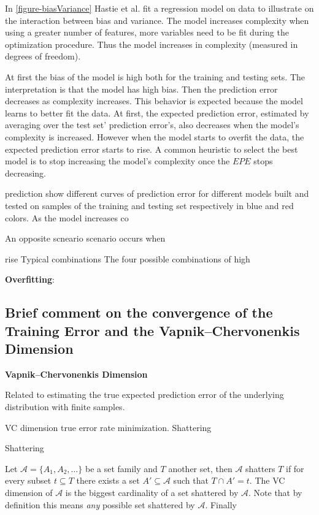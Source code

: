 In \ref{figure-biasVariance} Hastie et al. fit a regression model on data to illustrate on the interaction between bias and variance. The model increases complexity when using a greater number of features, more variables need to be fit during the optimization procedure. Thus the model increases in complexity (measured in degrees of freedom). 

At first the bias of the model is high both for the training and testing sets. The interpretation is that the model has high bias. Then the prediction error decreases as complexity increases. This behavior is expected because the model learns to better fit the data. At first, the expected prediction error, estimated by averaging over the test set' prediction error's, also decreases when the model's complexity is increased. However when the model starts to overfit the data, the expected prediction error starts to rise. A common heuristic to select the best model is to stop increasing the model's complexity once the $EPE$ stops decreasing.


prediction 
show different curves of prediction error for different models built and tested on samples of the training and testing set respectively in blue and red colors. As the model increases co

An opposite scneario scenario occurs when

rise Typical combinations
The four possible combinations of high 


\textbf{Overfitting}: 
 




\subsection{Brief comment on the convergence of the Training Error and the Vapnik–Chervonenkis Dimension}
\textbf{Vapnik–Chervonenkis Dimension}
\cite{vapnik-nature2013}
\cite{cherkassky-learning2007}

Related to estimating the true expected prediction error of the underlying distribution with finite samples.

VC dimension true error rate minimization. 
Shattering
\begin{definition}{Shattering}

Let $\mathcal {A}= \{A_1,A_{2},\dots \}$ be a set family and $T$  another set, then $\mathcal {A}$ shatters $T$ if for every subset $t \subseteq T$ there exists a set $A' \subseteq \mathcal {A} $ such that $ T \cap A' = t$. The VC dimension of $\mathcal {A}$ is the biggest cardinality of a set shattered by $\mathcal {A}$. Note that by definition this means \textit{any} possible set shattered by $\mathcal {A}$. Finally
 \end{definition}

